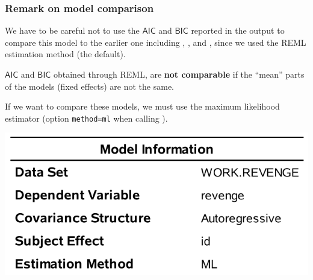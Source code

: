 \documentclass{beamer}
\begin{document}
% 
% 
% 

\begin{frame}[fragile]
\frametitle{Remark on model comparison}
\bi
\item We have to be careful \alert{not to use} the \ensuremath{\mathsf{AIC}}{} and \ensuremath{\mathsf{BIC}}{} reported in the output to compare this model to the earlier one including , ,  and , since we used the REML estimation method (the default). 
\item \ensuremath{\mathsf{AIC}}{} and \ensuremath{\mathsf{BIC}}{} obtained through REML, are \textbf{not comparable} if the ``mean'' parts of the models (fixed effects) are not the same. 
\item If we want to compare these models, we must use the maximum likelihood estimator (option \texttt{method=ml} when calling ). 
\ei
 \begin{center}
  \includegraphics[width = 0.5\linewidth]{img/c6/slides7-e05}
 \end{center}
   
\end{frame}
\end{document}
